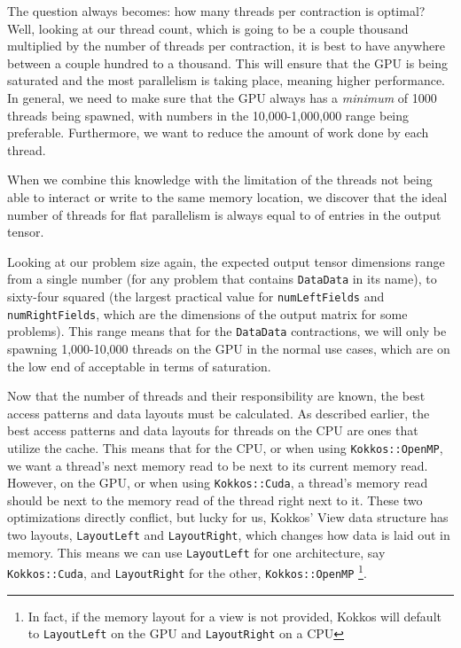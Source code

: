 The question always becomes: how many threads per contraction is optimal? Well, looking
at our thread count, which is going to be a couple thousand multiplied by the
number of threads per contraction, it is best to have anywhere between a couple
hundred to a thousand. This will ensure that the GPU is being saturated and the
most parallelism is taking place, meaning higher performance. 
In general, we need to make sure that the GPU always has a \emph{minimum} of 1000 threads being
spawned, with numbers in the 10,000-1,000,000 range being preferable. Furthermore,
we want to reduce the amount of work done by each thread.

When we combine this knowledge with the
limitation of the threads not being able to interact or write to the same
memory location, we discover that the ideal number of threads for flat parallelism
is always equal to
of entries in the output tensor. 

Looking at our problem size again, the
expected output tensor dimensions range from a single number (for any problem
that contains \texttt{DataData} in its name), to sixty-four squared (the largest practical value for
\texttt{numLeftFields} and \texttt{numRightFields}, which are the dimensions of the output matrix
for some problems). This range means that for the \texttt{DataData} contractions,
we will only be spawning 1,000-10,000 threads on the GPU in the normal use cases,
which are on the low end of acceptable in terms of saturation.

Now that the number of threads and their responsibility are known, the best
access patterns and data layouts must be calculated. As described earlier, the
best access patterns and data layouts for threads on the CPU are ones that
utilize the cache. This means that for the CPU, or when using \texttt{Kokkos::OpenMP},
we want a thread's next memory read to be next to its current memory read.
However, on the GPU, or when using \texttt{Kokkos::Cuda}, a thread's memory read should
be next to the memory read of the thread right next to it. These two
optimizations directly conflict, but lucky for us, Kokkos' View data structure
has two layouts, \texttt{LayoutLeft} and \texttt{LayoutRight}, which changes how data is laid out
in memory. This means we can use \texttt{LayoutLeft} for one architecture, say
\texttt{Kokkos::Cuda}, and \texttt{LayoutRight} for the other, \texttt{Kokkos::OpenMP}
\footnote{In fact, if the memory layout for a view is not provided, Kokkos will default
to \texttt{LayoutLeft} on the GPU and \texttt{LayoutRight} on a CPU}. 

